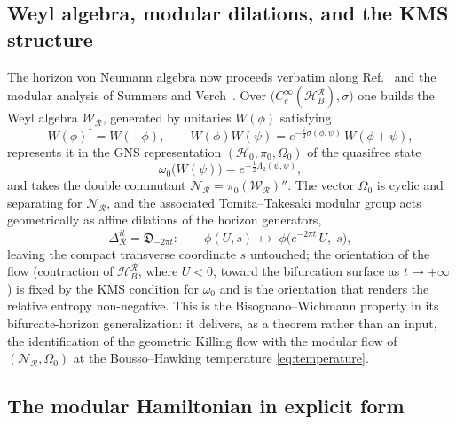 \documentclass[11pt]{article}
\begin{document}
\subsection{Weyl algebra, modular dilations, and the KMS structure}

The horizon von Neumann algebra now proceeds verbatim along Ref.~\cite{DorauMuch} and the modular analysis of Summers and Verch~\cite{SummersVerch}. Over $\big(C_c^\infty(\mathcal{H}_B^{\mathcal{R}}), \sigma\big)$ one builds the Weyl algebra $\mathscr{W}_{\mathcal{R}}$, generated by unitaries $W(\phi)$ satisfying
\begin{equation}
W(\phi)^\dagger = W(-\phi),
\qquad
W(\phi) W(\psi) = e^{-\frac{i}{2}\sigma(\phi,\psi)}\, W(\phi+\psi),
\end{equation}
represents it in the GNS representation $(\mathscr{H}_0, \pi_0, \Omega_0)$ of the quasifree state
\begin{equation}
\omega_0\big(W(\psi)\big) = e^{-\frac{1}{2}\Lambda_2(\psi,\psi)},
\end{equation}
and takes the double commutant $\mathscr{N}_{\mathcal{R}} = \pi_0(\mathscr{W}_{\mathcal{R}})''$. The vector $\Omega_0$ is cyclic and separating for $\mathscr{N}_{\mathcal{R}}$, and the associated Tomita--Takesaki modular group acts geometrically as affine dilations of the horizon generators,
\begin{equation}
\Delta_{\mathcal{R}}^{it} = \mathfrak{D}_{-2\pi t}:
\qquad
\phi(U, s) \;\longmapsto\; \phi\big(e^{-2\pi t}\, U,\; s\big),
\label{eq:dilations}
\end{equation}
leaving the compact transverse coordinate $s$ untouched; the orientation of the flow (contraction of $\mathcal{H}_B^{\mathcal{R}}$, where $U<0$, toward the bifurcation surface as $t \to +\infty$) is fixed by the KMS condition for $\omega_0$ and is the orientation that renders the relative entropy non-negative. This is the Bisognano--Wichmann property in its bifurcate-horizon generalization: it delivers, as a theorem rather than an input, the identification of the geometric Killing flow with the modular flow of $(\mathscr{N}_{\mathcal{R}}, \Omega_0)$ at the Bousso--Hawking temperature \eqref{eq:temperature}.

\subsection{The modular Hamiltonian in explicit form}
\label{sec:modularH}
\end{document}
